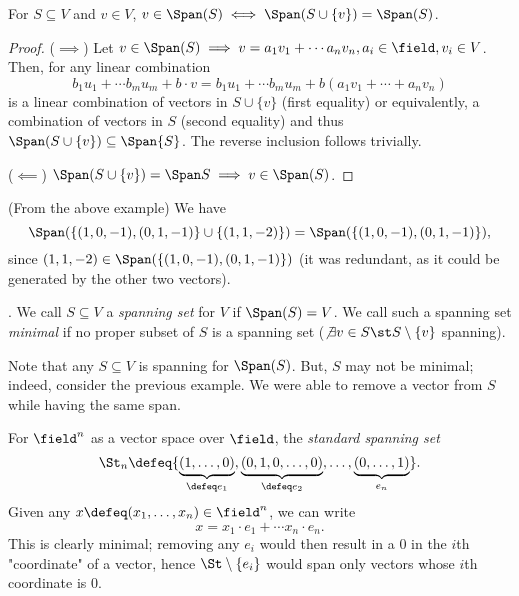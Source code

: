 \begin{lemma}
    For $S \subseteq V$ and $v \in V$, $v \in \Span (S) \iff \Span (S \cup \{v\}) = \Span (S)$.
\end{lemma}
\begin{proof}
    ($\implies$) Let $v \in \Span (S) \implies v = a_1 v_1 + \cdots a_n v_n, a_i \in \field, v_i \in V$. Then, for any linear combination \[
    b_1 u_1 + \cdots b_m u_m + b \cdot v  = b_1 u_1 + \cdots b_m u_m + b(a_1 v_1 + \cdots + a_n v_n)   
    \]
    is a linear combination of vectors in $S \cup \{v\}$ (first equality) or equivalently, a combination of vectors in $S$ (second equality) and thus $\Span (S \cup \{v\}) \subseteq \Span{S}$. The reverse inclusion follows trivially.

    ($\impliedby$) $\Span (S \cup \{v\}) = \Span S \implies v \in \Span (S)$.
\end{proof}

\begin{example}
    (From the above example) We have \[
    \Span (\{(1, 0, -1), (0, 1, -1)\} \cup \{(1, 1, -2)\}) = \Span( \{(1, 0, -1), (0, 1, -1) \}),
    \]
    since $(1, 1, -2) \in \Span(\{(1, 0, -1), (0, 1, -1) \})$ (it was redundant, as it could be generated by the other two vectors).
\end{example}

\begin{definition}
     . We call $S \subseteq V$ a \emph{spanning set} for $V$ if $\Span (S) = V$. We call such a spanning set \emph{minimal} if no proper subset of $S$ is a spanning set ($\not \exists v \in S \st S \setminus \{v\}$ spanning).
\end{definition}

\begin{remark}
    Note that any $S \subseteq V$ is spanning for $\Span (S)$. But, $S$ may not be minimal; indeed, consider the previous example. We were able to remove a vector from $S$ while having the same span.
\end{remark}

\begin{example}
    For $\field^n$ as a vector space over $\field$, the \emph{standard spanning set} $$\St_n \defeq \{\underbrace{(1, \dots, 0)}_{\defeq e_1}, \underbrace{(0, 1, 0, \dots, 0)}_{\defeq e_2}, \dots, \underbrace{(0, \dots, 1)}_{e_n}\}.$$
    Given any $x \defeq (x_1, \dots, x_n) \in \field^n$, we can write \[
        x = x_1 \cdot e_1 + \cdots x_n \cdot e_n.
    \]
    This is clearly minimal; removing any $e_i$ would then result in a $0$ in the $i$th "coordinate" of a vector, hence $\St \setminus\{e_i\}$ would span only vectors whose $i$th coordinate is $0$.
\end{example}

